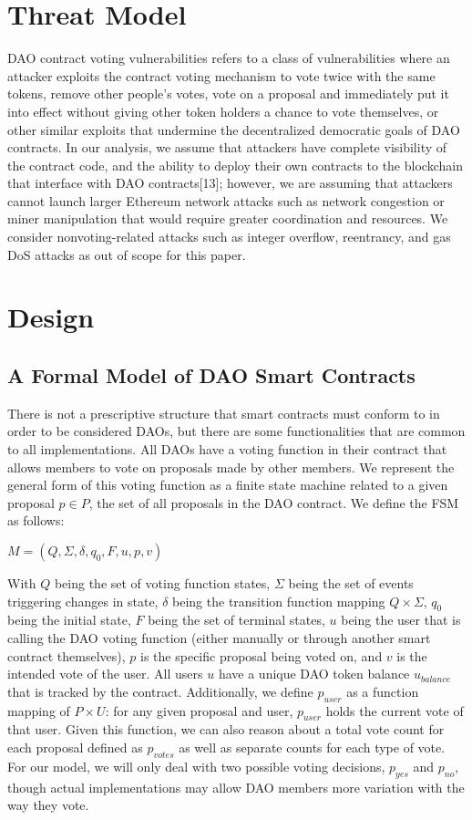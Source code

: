 \documentclass[conference]{IEEEtran}
\begin{document}
\section{Threat Model}
DAO contract voting vulnerabilities refers to a class of vulnerabilities where an attacker exploits the contract voting mechanism to vote twice with the same tokens, remove other people's votes, vote on a proposal and immediately put it into effect without giving other token holders a chance to vote themselves, or other similar exploits that undermine the decentralized democratic goals of DAO contracts. In our analysis, we assume that attackers have complete visibility of the contract code, and the ability to deploy their own contracts to the blockchain that interface with DAO contracts[13]; however, we are assuming that attackers cannot launch larger Ethereum network attacks such as network congestion or miner manipulation that would require greater coordination and resources. We consider nonvoting-related attacks such as integer overflow, reentrancy, and gas DoS attacks as out of scope for this paper. 

\section{Design}

\subsection{A Formal Model of DAO Smart Contracts}
There is not a prescriptive structure that smart contracts must conform to in order to be considered DAOs, but there are some functionalities that are common to all implementations. All DAOs have a voting function in their contract that allows members to vote on proposals made by other members. We represent the general form of this voting function as a finite state machine related to a given proposal $p \in P$, the set of all proposals in the DAO contract. 
We define the FSM as follows:
\begin{center}
$M = (Q, \Sigma, \delta, q_0, F, u, p, v)$
\end{center}

With $Q$ being the set of voting function states, $\Sigma$ being the set of events triggering changes in state, $\delta$ being the transition function mapping $Q\times\Sigma$, $q_0$ being the initial state, $F$ being the set of terminal states, $u$ being the user that is calling the DAO voting function (either manually or through another smart contract themselves), $p$ is the specific proposal being voted on, and $v$ is the intended vote of the user. All users $u$ have a unique DAO token balance $u_{balance}$ that is tracked by the contract. Additionally, we define $p_{user}$ as a function mapping of $P\times U$: for any given proposal and user, $p_{user}$ holds the current vote of that user. Given this function, we can also reason about a total vote count for each proposal defined as $p_{votes}$ as well as separate counts for each type of vote. For our model, we will only deal with two possible voting decisions, $p_{yes}$ and $p_{no}$, though actual implementations may allow DAO members more variation with the way they vote.
\end{document}
